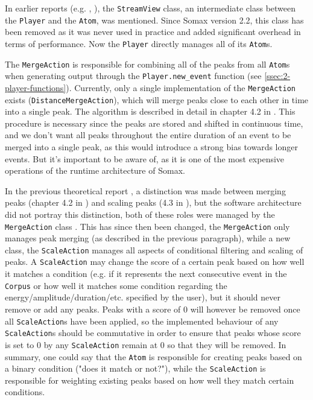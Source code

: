 In earlier reports (e.g. \cite{borg_2019}, \cite{somaxsoftware2021}), the \texttt{StreamView} class, an intermediate class between the \texttt{Player} and the \texttt{Atom}, was mentioned. Since Somax version 2.2, this class has been removed as it was never used in practice and added significant overhead in terms of performance. Now the \texttt{Player} directly manages all of its \texttt{Atom}s.

The \texttt{MergeAction} is responsible for combining all of the peaks from all \texttt{Atom}s when generating output through the \texttt{Player.new\_event} function (see \ref{ssec:2-player-functions}). Currently, only a single implementation of the \texttt{MergeAction} exists (\texttt{DistanceMergeAction}), which will merge peaks close to each other in time into a single peak. The algorithm is described in detail in chapter 4.2 in \cite{somaxtheory2021}. This procedure is necessary since the peaks are stored and shifted in continuous time, and we don't want all peaks throughout the entire duration of an event to be merged into a single peak, as this would introduce a strong bias towards longer events. But it's important to be aware of, as it is one of the most expensive operations of the runtime architecture of Somax.

In the previous theoretical report \cite{somaxtheory2021}, a distinction was made between merging peaks (chapter 4.2 in \cite{somaxtheory2021}) and scaling peaks (4.3 in \cite{somaxtheory2021}), but the software architecture did not portray this distinction, both of these roles were managed by the \texttt{MergeAction} class \cite{somaxsoftware2021}. This has since then been changed, the \texttt{MergeAction} only manages peak merging (as described in the previous paragraph), while a new class, the \texttt{ScaleAction} manages all aspects of conditional filtering and scaling of peaks. A \texttt{ScaleAction} may change the score of a certain peak based on how well it matches a condition (e.g. if it represents the next consecutive event in the \texttt{Corpus} or how well it matches some condition regarding the energy/amplitude/duration/etc. specified by the user), but it should never remove or add any peaks. Peaks with a score of 0 will however be removed once all \texttt{ScaleAction}s have been applied, so the implemented behaviour of any \texttt{ScaleAction}s should be commutative in order to ensure that peaks whose score is set to 0 by any \texttt{ScaleAction} remain at 0 so that they will be removed. In summary, one could say that the \texttt{Atom} is responsible for creating peaks based on a binary condition ("does it match or not?"), while the \texttt{ScaleAction} is responsible for weighting existing peaks based on how well they match certain conditions.

